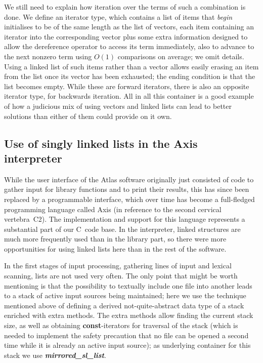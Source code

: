 \documentclass[12pt]{article}
\theoremstyle{plain}
\theoremstyle{definition}
\def\PP{\copy\PPbox}
\newcommand\Cee{\textsc{C}}
\newcommand\Cpp{\Cee\PP}
\begin{document}
We still need to explain how iteration over the terms of such a combination is
done. We define an iterator type, which contains a list of items that
\textit{begin} initialises to be of the same length as the list of vectors, each
item containing an iterator into the corresponding vector plus some extra
information designed to allow the dereference operator to access its term
immediately, also to advance to the next nonzero term using $O(1)$ comparisons
on average; we omit details. Using a linked list of such items rather than a
vector allows easily erasing an item from the list once its vector has been
exhausted; the ending condition is that the list becomes empty. While these are
forward iterators, there is also an opposite iterator type, for backwards
iteration. All in all this container is a good example of how a judicious mix
of using vectors and linked lists can lead to better solutions than either of
them could provide on it own.


\subsection{Use of singly linked lists in the Axis interpreter}

While the user interface of the Atlas software originally just consisted of code
to gather input for library functions and to print their results, this has since
been replaced by a programmable interface, which over time has become a
full-fledged programming language called Axis (in reference to the second
cervical vertebra~C2). The implementation and support for this language
represents a substantial part of our \Cpp\ code base. In the interpreter, linked
structures are much more frequently used than in the library part, so there were
more opportunities for using linked lists here than in the rest of the software.

In the first stages of input processing, gathering lines of input and lexical
scanning, lists are not used very often. The only point that might be worth
mentioning is that the possibility to textually include one file into another
leads to a stack of active input sources being maintained; here we use the
technique mentioned above of defining a derived not-quite-abstract data type of
a stack enriched with extra methods. The extra methods allow finding the current
stack size, as well as obtaining \textbf{const}-iterators for traversal of the
stack (which is needed to implement the safety precaution that no file can be
opened a second time while it is already an active input source); as underlying
container for this stack we use \textit{\textbf{mirrored\_\!sl\_\!list}}.
\end{document}
